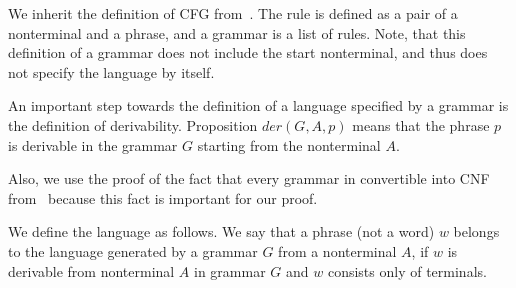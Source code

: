 We inherit the definition of CFG from~\cite{smolkaHofmann2016}. The rule is defined as a pair of a nonterminal and a phrase, and a grammar is a list of rules.
Note, that this definition of a grammar does not include the start nonterminal, and thus does not specify the language by itself.



An important step towards the definition of a language specified by a grammar is the definition of derivability. Proposition $der(G, A, p)$ means that the phrase $p$ is derivable in the grammar $G$ starting from the nonterminal $A$.


Also, we use the proof of the fact that every grammar in convertible into CNF from~\cite{smolkaHofmann2016} because this fact is important for our proof.

We define the language as follows. We say that a phrase (not a word) $ w $ belongs to the language generated by a grammar $G$ from a nonterminal $A$, if $ w $ is derivable from nonterminal $ A $ in grammar $ G $ and $ w $ consists only of terminals.




